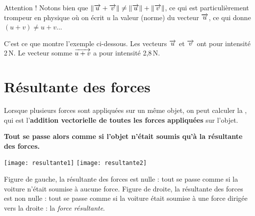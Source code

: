 \vspace{2em}

\begin{remarque}
Attention ! Notons bien que $\lVert\overrightarrow{u} + \overrightarrow{v}\rVert \neq \lVert\overrightarrow{u}\rVert + \lVert\overrightarrow{v}\rVert$, ce qui est particulièrement trompeur en physique où on écrit $u$ la valeur (norme) du vecteur $\overrightarrow{u}$, ce qui donne $(u+v) \neq u + v$... 

C'est ce que montre l'exemple ci-dessous. Les vecteurs $\overrightarrow{u}$ et $\overrightarrow{v}$ ont pour intensité 2\,N. Le vecteur somme $\overrightarrow{u+v}$ a pour intensité 2,8\,N.
\begin{center}
\end{center}

\end{remarque}







\section{Résultante des forces}

\begin{aconnaitre}
Lorsque plusieurs forces sont appliquées sur un même objet, on peut calculer la \textbf{}, qui est l'\textbf{addition vectorielle de toutes les forces appliquées} sur l'objet.

\vspace{1em}

\textbf{Tout se passe alors comme si l'objet n'était soumis qu'à la résultante des forces.}


\begin{center}
    \texttt{[image: resultante1]}%
    \hfill%
    \texttt{[image: resultante2]}
\end{center}

{\footnotesize Figure de gauche, la résultante des forces est nulle : tout se passe comme si la voiture n'était soumise à aucune force. Figure de droite, la résultante des forces est non nulle : tout se passe comme si la voiture était soumise à une force dirigée vers la droite : la \emph{force résultante}.}

\end{aconnaitre}












